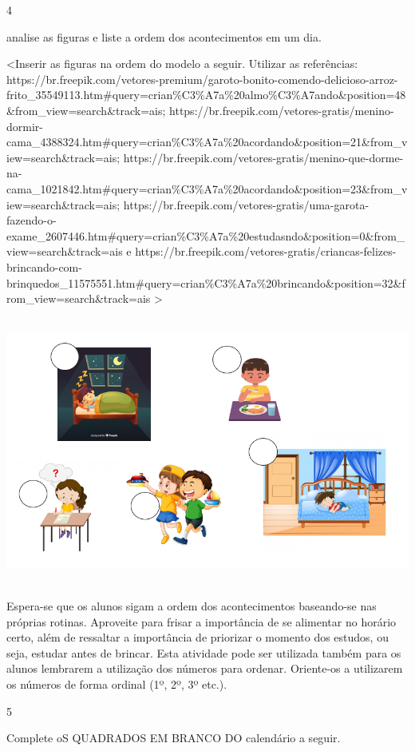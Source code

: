 \num{4}

analise as figuras e liste a ordem dos acontecimentos em um dia.

\textless{}Inserir as figuras na ordem do modelo a seguir. Utilizar as
referências:
https://br.freepik.com/vetores-premium/garoto-bonito-comendo-delicioso-arroz-frito\_35549113.htm\#query=crian\%C3\%A7a\%20almo\%C3\%A7ando\&position=48\&from\_view=search\&track=ais;
https://br.freepik.com/vetores-gratis/menino-dormir-cama\_4388324.htm\#query=crian\%C3\%A7a\%20acordando\&position=21\&from\_view=search\&track=ais;
https://br.freepik.com/vetores-gratis/menino-que-dorme-na-cama\_1021842.htm\#query=crian\%C3\%A7a\%20acordando\&position=23\&from\_view=search\&track=ais;
https://br.freepik.com/vetores-gratis/uma-garota-fazendo-o-exame\_2607446.htm\#query=crian\%C3\%A7a\%20estudasndo\&position=0\&from\_view=search\&track=ais
e
https://br.freepik.com/vetores-gratis/criancas-felizes-brincando-com-brinquedos\_11575551.htm\#query=crian\%C3\%A7a\%20brincando\&position=32\&from\_view=search\&track=ais
\textgreater{}

\includegraphics[width=5.90556in,height=3.46597in]{media/image36.png}

Espera-se que os alunos sigam a ordem dos acontecimentos
baseando-se nas próprias rotinas. Aproveite para frisar a importância de
se alimentar no horário certo, além de
ressaltar a importância de priorizar o momento dos estudos, ou seja,
estudar antes de brincar. Esta atividade pode ser utilizada também para
os alunos lembrarem a utilização dos números para ordenar.
Oriente-os a utilizarem os números de forma ordinal (1º, 2º, 3º etc.).

\num{5}

Complete oS QUADRADOS EM BRANCO DO calendário a seguir.

